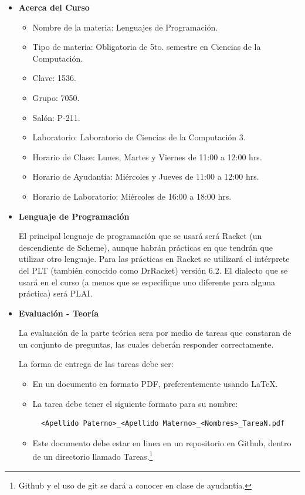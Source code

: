 \documentclass[10pt]{article}
\begin{document}
\begin{itemize}
\item \textbf{Acerca del Curso}

  \begin{itemize}
  \item  Nombre de la materia: Lenguajes de Programación.
  \item Tipo de materia: Obligatoria de 5to. semestre en Ciencias de
    la Computación.
  \item Clave: 1536.
  \item Grupo: 7050.
  \item Salón: P-211.
  \item Laboratorio: Laboratorio de Ciencias de la Computación 3.
  \item Horario de Clase: Lunes, Martes y Viernes de 11:00 a 12:00 hrs.
  \item Horario de Ayudantía: Miércoles y Jueves de 11:00 a 12:00 hrs.
  \item Horario de Laboratorio: Miércoles de 16:00 a 18:00 hrs.
  \end{itemize}

\item \textbf{Lenguaje de Programación}

  El principal lenguaje de programación que se usará será Racket (un
  descendiente de Scheme), aunque habrán prácticas en que tendrán
  que utilizar otro lenguaje. Para las prácticas en Racket se utilizará el
  intérprete del PLT (también conocido como DrRacket) versión 6.2. El dialecto que se
  usará en el curso (a menos que se especifique uno diferente para alguna práctica)
  será PLAI.

\item \textbf{Evaluación - Teoría}

  La evaluación de la parte teórica sera por medio de tareas que constaran de un conjunto de preguntas, las cuales deberán responder correctamente.

  La forma de entrega de las tareas debe ser:
  \begin{itemize}
  \item En un documento en formato PDF, preferentemente usando \LaTeX.
  \item La tarea debe tener el siguiente formato para su nombre:
\begin{verbatim}
  <Apellido Paterno>_<Apellido Materno>_<Nombres>_TareaN.pdf
\end{verbatim}
\item Este documento debe estar en linea en un repositorio en Github,
  dentro de un directorio llamado Tareas.\footnote{Github y el uso de git se dará a conocer en clase de ayudantía.}
  \end{itemize}


\end{itemize}
\end{document}
